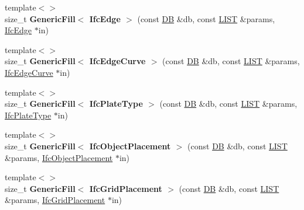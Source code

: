 \begin{DoxyCompactItemize}
\item 
\hypertarget{namespace_assimp_1_1_s_t_e_p_ad2ca209dd8929c23b21e6ad8f58e9c80}{{\footnotesize template$<$$>$ }\\size\+\_\+t {\bfseries Generic\+Fill$<$ Ifc\+Edge $>$} (const \hyperlink{class_assimp_1_1_s_t_e_p_1_1_d_b}{D\+B} \&db, const \hyperlink{class_assimp_1_1_s_t_e_p_1_1_e_x_p_r_e_s_s_1_1_l_i_s_t}{L\+I\+S\+T} \&params, \hyperlink{struct_assimp_1_1_i_f_c_1_1_ifc_edge}{Ifc\+Edge} $\ast$in)}\label{namespace_assimp_1_1_s_t_e_p_ad2ca209dd8929c23b21e6ad8f58e9c80}

\item 
\hypertarget{namespace_assimp_1_1_s_t_e_p_a2052071c06dd1ac0fd2dad5419f2021f}{{\footnotesize template$<$$>$ }\\size\+\_\+t {\bfseries Generic\+Fill$<$ Ifc\+Edge\+Curve $>$} (const \hyperlink{class_assimp_1_1_s_t_e_p_1_1_d_b}{D\+B} \&db, const \hyperlink{class_assimp_1_1_s_t_e_p_1_1_e_x_p_r_e_s_s_1_1_l_i_s_t}{L\+I\+S\+T} \&params, \hyperlink{struct_assimp_1_1_i_f_c_1_1_ifc_edge_curve}{Ifc\+Edge\+Curve} $\ast$in)}\label{namespace_assimp_1_1_s_t_e_p_a2052071c06dd1ac0fd2dad5419f2021f}

\item 
\hypertarget{namespace_assimp_1_1_s_t_e_p_ac56c61decf95764d8f053ddfcb82e9a0}{{\footnotesize template$<$$>$ }\\size\+\_\+t {\bfseries Generic\+Fill$<$ Ifc\+Plate\+Type $>$} (const \hyperlink{class_assimp_1_1_s_t_e_p_1_1_d_b}{D\+B} \&db, const \hyperlink{class_assimp_1_1_s_t_e_p_1_1_e_x_p_r_e_s_s_1_1_l_i_s_t}{L\+I\+S\+T} \&params, \hyperlink{struct_assimp_1_1_i_f_c_1_1_ifc_plate_type}{Ifc\+Plate\+Type} $\ast$in)}\label{namespace_assimp_1_1_s_t_e_p_ac56c61decf95764d8f053ddfcb82e9a0}

\item 
\hypertarget{namespace_assimp_1_1_s_t_e_p_ae18eb2df8b3cf4c1abcaefac7951ee17}{{\footnotesize template$<$$>$ }\\size\+\_\+t {\bfseries Generic\+Fill$<$ Ifc\+Object\+Placement $>$} (const \hyperlink{class_assimp_1_1_s_t_e_p_1_1_d_b}{D\+B} \&db, const \hyperlink{class_assimp_1_1_s_t_e_p_1_1_e_x_p_r_e_s_s_1_1_l_i_s_t}{L\+I\+S\+T} \&params, \hyperlink{struct_assimp_1_1_i_f_c_1_1_ifc_object_placement}{Ifc\+Object\+Placement} $\ast$in)}\label{namespace_assimp_1_1_s_t_e_p_ae18eb2df8b3cf4c1abcaefac7951ee17}

\item 
\hypertarget{namespace_assimp_1_1_s_t_e_p_ab60737222cd15dd56a56cb52d94ead47}{{\footnotesize template$<$$>$ }\\size\+\_\+t {\bfseries Generic\+Fill$<$ Ifc\+Grid\+Placement $>$} (const \hyperlink{class_assimp_1_1_s_t_e_p_1_1_d_b}{D\+B} \&db, const \hyperlink{class_assimp_1_1_s_t_e_p_1_1_e_x_p_r_e_s_s_1_1_l_i_s_t}{L\+I\+S\+T} \&params, \hyperlink{struct_assimp_1_1_i_f_c_1_1_ifc_grid_placement}{Ifc\+Grid\+Placement} $\ast$in)}\label{namespace_assimp_1_1_s_t_e_p_ab60737222cd15dd56a56cb52d94ead47}


\end{DoxyCompactItemize}
